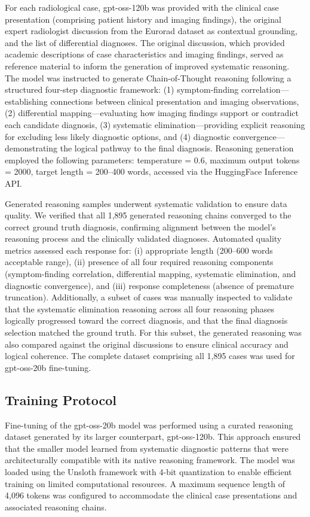\documentclass[10pt,journal,compsoc, onecolumn]{IEEEtran}
\begin{document}
For each radiological case, gpt-oss-120b was provided with the clinical case presentation (comprising patient history and imaging findings), the original expert radiologist discussion from the Eurorad dataset as contextual grounding, and the list of differential diagnoses. The original discussion, which provided academic descriptions of case characteristics and imaging findings, served as reference material to inform the generation of improved systematic reasoning. The model was instructed to generate Chain-of-Thought reasoning following a structured four-step diagnostic framework: (1) symptom-finding correlation---establishing connections between clinical presentation and imaging observations, (2) differential mapping---evaluating how imaging findings support or contradict each candidate diagnosis, (3) systematic elimination---providing explicit reasoning for excluding less likely diagnostic options, and (4) diagnostic convergence---demonstrating the logical pathway to the final diagnosis. Reasoning generation employed the following parameters: temperature = 0.6, maximum output tokens = 2000, target length = 200--400 words, accessed via the HuggingFace Inference API.

Generated reasoning samples underwent systematic validation to ensure data quality. We verified that all 1,895 generated reasoning chains converged to the correct ground truth diagnosis, confirming alignment between the model's reasoning process and the clinically validated diagnoses. Automated quality metrics assessed each response for: (i) appropriate length (200--600 words acceptable range), (ii) presence of all four required reasoning components (symptom-finding correlation, differential mapping, systematic elimination, and diagnostic convergence), and (iii) response completeness (absence of premature truncation). Additionally, a subset of cases was manually inspected to validate that the systematic elimination reasoning across all four reasoning phases logically progressed toward the correct diagnosis, and that the final diagnosis selection matched the ground truth. For this subset, the generated reasoning was also compared against the original discussions to ensure clinical accuracy and logical coherence. The complete dataset comprising all 1,895 cases was used for gpt-oss-20b fine-tuning.

\subsection*{Training Protocol}
Fine-tuning of the gpt-oss-20b model was performed using a curated reasoning dataset generated by its larger counterpart, gpt-oss-120b. This approach ensured that the smaller model learned from systematic diagnostic patterns that were architecturally compatible with its native reasoning framework. The model was loaded using the Unsloth framework with 4-bit quantization to enable efficient training on limited computational resources. A maximum sequence length of 4,096 tokens was configured to accommodate the clinical case presentations and associated reasoning chains.
\end{document}
